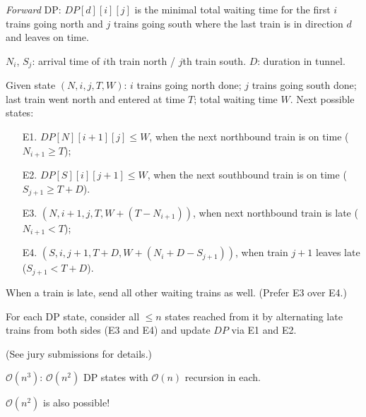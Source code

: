 \begin{frame}
    \frametitle{\problemtitle}
    \begin{description}
        \item<+-> [Solution:] \emph{Forward} DP:
          $DP[d][i][j]$ is the minimal total waiting time for the first $i$
          trains going north and $j$ trains going south where the last train is
          in direction $d$ and leaves on time.
        \item<+-> [Notation:] $N_i$, $S_j$: arrival time of $i$th train north /
          $j$th train south.
          $D$: duration in tunnel.
        \item<+-> [Expand:] Given state $(N, i, j, T, W)$: $i$ trains going north done; $j$
          trains going south done; last train went north and entered at time $T$; total
          waiting time $W$. Next possible states:
          \begin{enumerate}
            \item[E1.] $DP[N][i+1][j] \leq W$, when the next northbound train is on time ($N_{i+1} \geq T$);
            \item[E2.] $DP[S][i][j+1] \leq W$, when the next southbound train is on time ($S_{j+1} \geq T + D$).
            \item[E3.] $(N, i{+}1, j, T, W+(T-N_{i+1}))$, when next northbound train is late ($N_{i+1} {<} T$);
            \item[E4.] $(S, i, j{+}1, T{+}D, W + (N_i + D -S_{j+1}))$, when train $j{+}1$ leaves late ($S_{j+1} {<} T{+}D$).
          \end{enumerate}
        \item<+-> [Greedy:] When a train is late, send all other waiting trains
          as well. (Prefer E3 over E4.)
        \item<+-> [Recursion:] For each DP state, consider all $\leq n$ states
          reached from it by alternating late trains from both sides
          (E3 and E4) and update $DP$ via E1 and E2.

          (See jury submissions for details.)
      \item<+-> [Run time:] $\mathcal O(n^3)$: $\mathcal O(n^2)$ DP states with $\mathcal O(n)$ recursion in each.
      \item<+-> [Challenge:] $\mathcal O(n^2)$ is also possible!
    \end{description}
    \solvestats
\end{frame}
